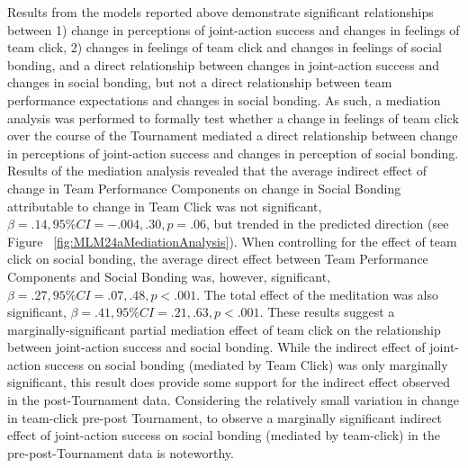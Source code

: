 \begin{CJK}{UTF8}{gbsn}

  Results from the models reported above demonstrate significant relationships between 1) change in perceptions of joint-action success and changes in feelings of team click, 2) changes in feelings of team click and changes in feelings of social bonding, and a direct relationship between changes in joint-action success and changes in social bonding, but not a direct relationship between team performance expectations and changes in social bonding. As such, a mediation analysis was performed to formally test whether a change in feelings of team click over the course of the Tournament mediated a direct relationship between change in perceptions of joint-action success and changes in perception of social bonding.\\

  Results of the mediation analysis revealed that the average indirect effect of change in Team Performance Components on change in Social Bonding attributable to change in Team Click was not significant, $\beta = .14, 95\% CI = -.004 , .30, p = .06$, but trended in the predicted direction (see Figure ~\ref{fig:MLM24aMediationAnalysis}).  When controlling for the effect of team click on social bonding, the average direct effect between Team Performance Components and Social Bonding was, however, significant, $\beta = .27, 95\% CI = .07 , .48, p < .001$.  The total effect of the meditation was also significant, $\beta = .41, 95\% CI = .21 , .63, p < .001$.  These results suggest a marginally-significant partial mediation effect of team click on the relationship between joint-action success and social bonding.  While the indirect effect of joint-action success on social bonding (mediated by Team Click) was only marginally significant, this result does provide some support for the indirect effect observed in the post-Tournament data.  Considering the relatively small variation in change in team-click pre-post Tournament, to observe a marginally significant indirect effect of joint-action success on social bonding (mediated by team-click) in the pre-post-Tournament data is noteworthy.



\end{CJK}
